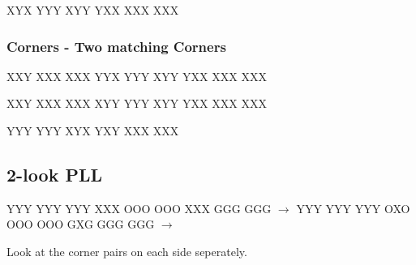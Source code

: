 \documentclass[9pt,dvipsnames]{extarticle}
\begin{document}
\begin{multicols*}{4}
\RubikCubeGreyAll%
\RubikFaceUp%
{X}{Y}{X}
{Y}{Y}{Y}
{X}{Y}{Y}
\RubikFaceFront%
{Y}{X}{X}
{X}{X}{X}
{X}{X}{X}

\subsubsection*{Corners - Two matching Corners}

\RubikCubeGreyAll%
\RubikFaceRight%
{X}{X}{Y}
{X}{X}{X}
{X}{X}{X}
\RubikFaceUp%
{Y}{Y}{X}
{Y}{Y}{Y}
{X}{Y}{Y}
\RubikFaceFront%
{Y}{X}{X}
{X}{X}{X}
{X}{X}{X}

\RubikCubeGreyAll%
\RubikFaceBack%
{X}{X}{Y}
{X}{X}{X}
{X}{X}{X}
\RubikFaceUp%
{X}{Y}{Y}
{Y}{Y}{Y}
{X}{Y}{Y}
\RubikFaceFront%
{Y}{X}{X}
{X}{X}{X}
{X}{X}{X}

\RubikCubeGreyAll%
\RubikFaceUp%
{Y}{Y}{Y}
{Y}{Y}{Y}
{X}{Y}{X}
\RubikFaceFront%
{Y}{X}{Y}
{X}{X}{X}
{X}{X}{X}

\subsection*{2-look PLL}

\noindent%
\RubikFaceUp%
{Y}{Y}{Y}
{Y}{Y}{Y}
{Y}{Y}{Y}%
\RubikFaceRight%
{X}{X}{X}
{O}{O}{O}
{O}{O}{O}%
\RubikFaceFront%
{X}{X}{X}
{G}{G}{G}
{G}{G}{G}%
\ShowCube{\cubesize}{\cubescale}{\DrawRubikCube}%
$\rightarrow$%
\noindent%
\RubikFaceUp%
{Y}{Y}{Y}
{Y}{Y}{Y}
{Y}{Y}{Y}%
\RubikFaceRight%
{O}{X}{O}
{O}{O}{O}
{O}{O}{O}%
\RubikFaceFront%
{G}{X}{G}
{G}{G}{G}
{G}{G}{G}%
\ShowCube{\cubesize}{\cubescale}{\DrawRubikCube}%
$\rightarrow$%
\RubikCubeSolved%
\ShowCube{\cubesize}{\cubescale}{\DrawRubikCube}

Look at the corner pairs on each side seperately.


\end{multicols*}
\end{document}
